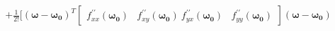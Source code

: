\documentclass[preview]{standalone}
\begin{document}
\begin{align*}
+ \frac{1}{2 !}[ (\mathbf{\omega} - \mathbf{\omega_0})^T \begin{bmatrix} f_{xx}^{\prime \prime}(\mathbf{\omega_0}) & f_{xy}^{\prime \prime}(\mathbf{\omega_0}) \ f_{yx}^{\prime \prime}(\mathbf{\omega_0}) & f_{yy}^{\prime \prime}(\mathbf{\omega_0})\end{bmatrix} (\mathbf{\omega} - \mathbf{\omega_0})
\end{align*}
\end{document}
